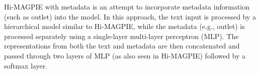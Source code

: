 Hi-MAGPIE with metadata is an attempt to incorporate metadata information (such as outlet) into the model. In this approach, the text input is processed by a hierarchical model similar to Hi-MAGPIE, while the metadata (e.g., outlet) is processed separately using a single-layer multi-layer perceptron (MLP). The representations from both the text and metadata are then concatenated and passed through two layers of MLP (as also seen in Hi-MAGPIE) followed by a softmax layer.

